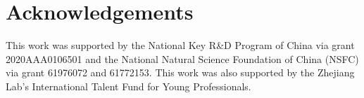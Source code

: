 \documentclass[letterpaper]{article} \usepackage{aaai22}  \usepackage{times}  \usepackage{helvet}  \usepackage{courier}  \usepackage[hyphens]{url}  \usepackage{graphicx} \urlstyle{rm} \def\UrlFont{\rm}  \usepackage{natbib}  \usepackage{caption} \DeclareCaptionStyle{ruled}{labelfont=normalfont,labelsep=colon,strut=off} \frenchspacing  \setlength{\pdfpagewidth}{8.5in}  \setlength{\pdfpageheight}{11in}  \usepackage{algorithm}
\begin{document}
\section*{Acknowledgements}
This work was supported by the National Key R\&D Program of China via grant 2020AAA0106501 and the National Natural Science Foundation of China (NSFC) via grant 61976072 and 61772153. This work was also supported by the Zhejiang Lab’s International Talent Fund for Young Professionals. 


\end{document}
